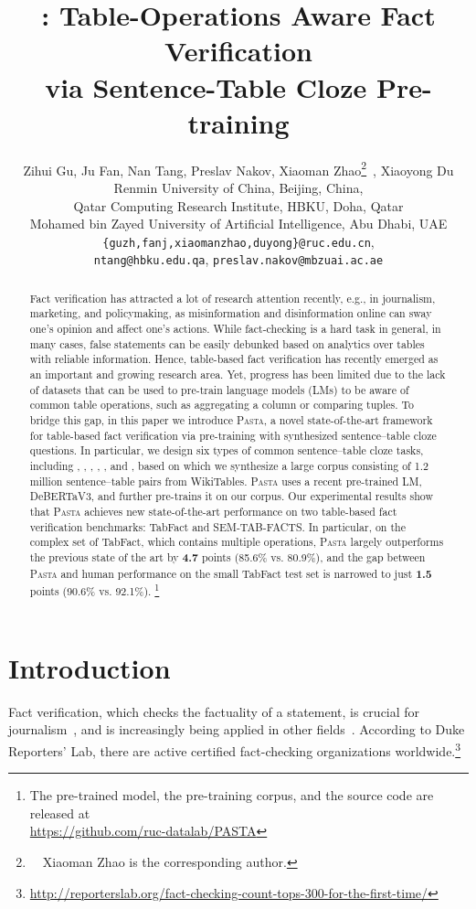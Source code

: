 \documentclass[11pt]{article}
\title{\pasta: Table-Operations Aware Fact Verification\\ via Sentence-Table Cloze Pre-training}
\author{Zihui Gu, Ju Fan, Nan Tang, Preslav Nakov, Xiaoman Zhao\thanks{~~Xiaoman Zhao is the corresponding author.}~, Xiaoyong Du \\
  Renmin University of China, Beijing, China, \\
  Qatar Computing Research Institute, HBKU, Doha, Qatar \\
  Mohamed bin Zayed University of Artificial Intelligence, Abu Dhabi, UAE \\
  \texttt{\{guzh,fanj,xiaomanzhao,duyong\}@ruc.edu.cn}, 
  \\ \texttt{ntang@hbku.edu.qa}, \texttt{preslav.nakov@mbzuai.ac.ae}\\}
\newcommand{\pasta}{\textsc{Pasta}\xspace}
\newcommand{\eg}{{e.g.,}\xspace}
\newcommand{\term}[1]{\xspace}
\begin{document}
\maketitle

\begin{abstract}
Fact verification has attracted a lot of research attention recently, \eg in journalism, marketing, and policymaking, 
as misinformation and disinformation online can sway one's opinion and affect one's actions. 
While fact-checking is a hard task in general, in many cases, false statements can be easily debunked based on analytics over tables with reliable information.
Hence, table-based fact verification has recently emerged as an important and growing research area.
Yet, progress has been limited due to the lack of datasets that can be used to pre-train language models (LMs) to be aware of common table operations, such as aggregating a column or comparing tuples. 
To bridge this gap, in this paper we introduce \pasta, a novel state-of-the-art framework for table-based fact verification via pre-training with synthesized sentence--table cloze questions.
In particular, we design six types of common sentence--table cloze tasks, including \term{Filter}, \term{Aggregation}, \term{Superlative}, \term{Comparative}, \term{Ordinal}, and \term{Unique}, based on which we synthesize a large corpus consisting of 1.2 million sentence--table pairs from WikiTables.
\pasta uses a recent pre-trained LM, DeBERTaV3, and further pre-trains it on our corpus.
Our experimental results show that \pasta achieves new state-of-the-art performance on two table-based fact verification benchmarks: TabFact and SEM-TAB-FACTS. In particular, on the complex set of TabFact, which contains multiple operations, \pasta largely outperforms the previous state of the art by {\bf 4.7} points (85.6\% vs. 80.9\%), and the gap between \pasta and human performance on the small TabFact test set is narrowed to just {\bf 1.5} points (90.6\% vs. 92.1\%).
\footnote{The pre-trained model, the pre-training corpus, and the source code are released at\\ \url{https://github.com/ruc-datalab/PASTA}}
\end{abstract} 




\section{Introduction}

Fact verification, which checks the factuality of a statement, is crucial for journalism~\cite{fakenews}, and is increasingly being  applied in other fields~\cite{application1,application2}.
According to Duke Reporters' Lab, there are  active certified fact-checking organizations worldwide.\footnote{\url{http://reporterslab.org/fact-checking-count-tops-300-for-the-first-time/}}
\end{document}
